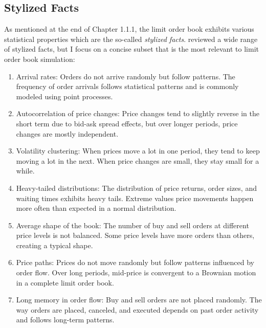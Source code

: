 \subsection{Stylized Facts} \label{cp: facts}
As mentioned at the end of Chapter 1.1.1, the limit order book exhibits various statistical properties which are the so-called \textit{stylized facts}. \cite{vyetrenko_get_2019} reviewed a wide range of stylized facts, but I focus on a concise subset that is the most relevant to limit order book simulation:
\begin{enumerate}
    \item Arrival rates: Orders do not arrive randomly but follow patterns. The frequency of order arrivals follows statistical patterns and is commonly modeled using point processes.
    \item Autocorrelation of price changes: Price changes tend to slightly reverse in the short term due to bid-ask spread effects, but over longer periods, price changes are mostly independent.
    \item Volatility clustering: When prices move a lot in one period, they tend to keep moving a lot in the next. When price changes are small, they stay small for a while.
    \item Heavy-tailed distributions: The distribution of price returns, order sizes, and waiting times exhibits heavy tails. Extreme values price movements happen more often than expected in a normal distribution.
    \item Average shape of the book: The number of buy and sell orders at different price levels is not balanced. Some price levels have more orders than others, creating a typical shape.
    \item Price paths: Prices do not move randomly but follow patterns influenced by order flow. Over long periods, mid-price is convergent to a Brownian motion in a complete limit order book. 
    \item Long memory in order flow: Buy and sell orders are not placed randomly. The way orders are placed, canceled, and executed depends on past order activity and follows long-term patterns.
\end{enumerate}


